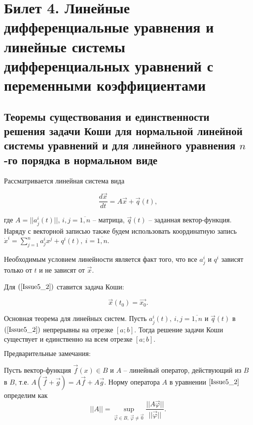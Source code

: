 \section{Билет 4. Линейные дифференциальные уравнения и линейные системы дифференциальных уравнений с переменными коэффициентами}

\subsection{Теоремы существования и единственности решения задачи Коши для нормальной линейной системы уравнений и
для линейного уравнения $n$-го порядка в нормальном виде}

Рассматривается линейная система вида

\begin{equation}
	\frac{d\overrightarrow{x}}{dt} = A\overrightarrow{x} + \overrightarrow{q}(t),
	\label{Issue5_2}
\end{equation}

где $A = ||a_j^i(t)||$, $i, j = \overline{1, n}$ -- матрица, $\overrightarrow{q}(t)$ -- заданная вектор-функция. Наряду с векторной записью также будем использовать координатную запись $\dot{x}^i = \sum\limits_{j = 1}^{n} a_j^i x^j + q^i(t),\ i = \overline{1, n}$.

$\textbf{Необходимым условием линейности}$ является факт того, что все $a_j^i$ и $q^i$ зависят только от $t$ и не зависят от $\overrightarrow{x}$.

Для $(\ref{Issue5_2})$ ставится задача Коши:

\[ \overrightarrow{x}(t_0) = \overrightarrow{x_0}.\]

\begin{theorem}

$\textbf{Основная теорема для линейных систем.}$ Пусть $a_j^i(t),\ i, j = \overline{1, n}$ и $\overrightarrow{q}(t)$ в $(\ref{Issue5_2})$ непрерывны на отрезке $[a;b]$. Тогда решение задачи Коши существует и единственно на всем отрезке $[a;b].$
\label{4_1_Cauchy}
\end{theorem}

$\textbf{Предварительные замечания:}$

Пусть вектор-функция $\overrightarrow{f}(x) \in B$ и $A$ -- линейный оператор, действующий из $B$ в $B$, т.е. $A(\overrightarrow{f} + \overrightarrow{g}) = A\overrightarrow{f} + A\overrightarrow{g}$.
Норму оператора $A$ в уравнении $\eqref{Issue5_2}$ определим как
\[ ||A|| =  \sup\limits_{\overrightarrow{\varphi} \in B,\ \overrightarrow{\varphi} \neq \overrightarrow{0}} \frac{||A\overrightarrow{\varphi}||}{||\overrightarrow{\varphi}||}. \]

